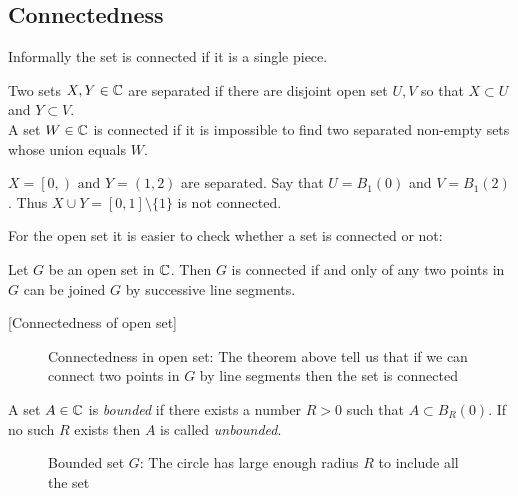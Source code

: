 \documentclass{caesar_book}
\begin{document}
\subsection{Connectedness}
Informally the set is connected if it is a single piece.
\begin{definition}
    Two sets $X, Y \in {\mathbb{C}}$ are separated if there are disjoint open set $U, V$ so that  $X \subset U$ and  $Y \subset V$.\\
   A set  $W \in {\mathbb{C}}$ is connected if it is impossible to find two separated non-empty sets whose union equals $W$.
        
\end{definition}

\begin{texample}
$X = \left[0, \right) \text{ and } Y=\left(1, 2\right)$
are separated. Say that $U=B_1(0)$ and  $V=B_1(2)$. Thus  $X \cup Y=\left[ 0,1 \right] \setminus \{1\}$ is not connected.
\begin{center}
\end{center}
\end{texample}

For the open set it is easier to check whether a set is connected or not:
\begin{definition}
   Let $G$  be an open set in ${\mathbb{C}}$. Then $G$ is connected if and only of any two points in  $G$ can be joined  $G$ by successive line segments.
\end{definition}[Connectedness of open set]
\begin{figure}[ht]
    \centering
    \caption{Connectedness in open set: The theorem above tell us that if we can connect two points in $G$ by line segments then the set is connected}
    \label{fig:connectedness_open_set}
\end{figure}

\begin{definition}
    A set $A \in {\mathbb{C}}$ is \emph{bounded} if there exists a number $R>0$ such that $A \subset B_R(0)$. If no such  $R$ exists then $A$ is called \emph{unbounded}.
\end{definition}
\begin{figure}[ht]
    \centering
    \caption{Bounded set $G$: The circle has large enough radius $R$ to include all the set}
    \label{fig:bounded_set}
\end{figure}
\end{document}
